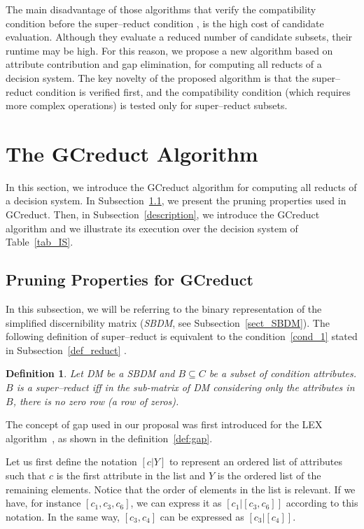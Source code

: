 \documentclass[number,preprint,review,12pt]{elsarticle}
\newtheorem{definition}{Definition}
\begin{document}
  The main disadvantage of those algorithms that verify the compatibility condition before the super--reduct condition \citep{Santiesteban03,WangP07,Lias13}, is the high cost of candidate evaluation. Although they evaluate a reduced number of candidate subsets, their runtime may be high. For this reason, we propose a new algorithm based on attribute contribution and gap elimination, for computing all reducts of a decision system. The key novelty of the proposed algorithm is that the super--reduct condition is verified first, and the compatibility condition (which requires more complex operations) is tested only for super--reduct subsets.
  
  
\section{The GCreduct Algorithm}\label{GCreduct}
  In this section, we introduce the GCreduct algorithm for computing all reducts of a decision system. In  Subsection~\ref{properties}, we present the pruning properties used in GCreduct. Then, in Subsection~\ref{description}, we introduce the GCreduct algorithm and we illustrate its execution over the decision system of Table~\ref{tab_IS}.
  
\subsection{Pruning Properties for GCreduct}\label{properties}
	In this subsection, we will be referring to the binary representation of the simplified discernibility matrix (\textit{SBDM}, see Subsection~\ref{sect_SBDM}). The following definition of super--reduct is equivalent to the condition~\ref{cond_1} stated in Subsection~\ref{def_reduct} \citep{Lazo15}.
	
	\begin{definition}\label{def:testor}
		Let DM be a SBDM and $B \subseteq C$ be a subset of condition attributes. $B$ is a super--reduct iff in the sub-matrix of DM considering only the attributes in $B$, there is no zero row (a row of zeros).
	\end{definition}
	
	The concept of gap used in our proposal was first introduced for the LEX algorithm~\cite{Santiesteban03}, as shown in the definition~\ref{def:gap}.
	
	Let us first define the notation $[c|Y]$ to represent an ordered list of attributes such that $c$ is the first attribute in the list and $Y$ is the ordered list of the remaining elements. Notice that the order of elements in the list is relevant. If we have, for instance $[c_1,c_3,c_6]$, we can express it as $[c_1|[c_3,c_6]]$ according to this notation. In the same way, $[c_3,c_4]$ can be expressed as $[c_3|[c_4]]$.
	
\end{document}

